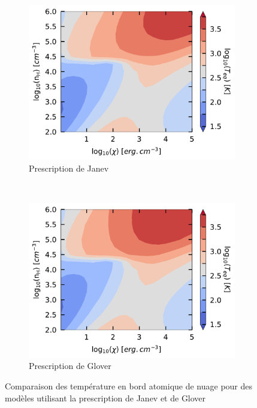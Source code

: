 \begin{appendices}
\vfill
\begin{figure}[!h]
    \centering
    \begin{subfigure}[t]{0.49\textwidth} %
        \centering \includegraphics[trim = {0 0 0 0 },clip,width=1\textwidth]{figure/H2/grid_janev/mapTba.pdf}
        \caption{Prescription de Janev}
    \end{subfigure}
    ~ 
    \begin{subfigure}[t]{0.49\textwidth}
        \centering \includegraphics[trim = {0 0 0 0 },clip,width=1\textwidth]{figure/H2/grid_glover/mapTba.pdf}
        \caption{Prescription de Glover}
    \end{subfigure}
    \caption{Comparaison des température en bord atomique de nuage pour des modèles utilisant la prescription de Janev et de Glover}
    \label{fig:H2:JanevGlover:Tba}
\end{figure}
\vfill


\end{appendices}
